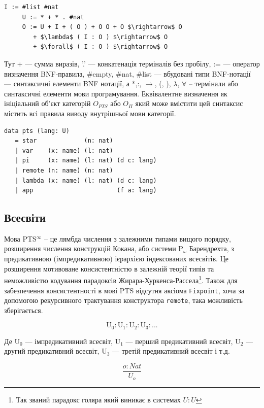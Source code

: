 \begin{lstlisting}[mathescape=true]
     I := #list #nat
     U := * + * . #nat
     O := U + I + ( O ) + O O + O $\rightarrow$ O
        + $\lambda$ ( I : O ) $\rightarrow$ O
        + $\forall$ ( I : O ) $\rightarrow$ O
\end{lstlisting}

Тут + --- сумма виразів, '.' --- конкатенація терміналів без пробілу,
:= --- оператор визначення BNF-правила, \#empty, \#nat, \#list --- вбудовані типи BNF-нотації
--- синтаксичні елементи BNF нотації,
а *,:, $\rightarrow$, (, ), $\lambda$, $\forall$ -- термінали або синтаксичні елементи мови програмування.
Еквівалентне визначення як ініціальний об'єкт категорій $O_{PTS}$ або $O_\Pi$
який може вмістити цей синтаксис містить всі правила виводу
внутрішньої мови категорії.

\begin{lstlisting}[mathescape=true]
data pts (lang: U)
   = star             (n: nat)
   | var    (x: name) (l: nat)
   | pi     (x: name) (l: nat) (d c: lang)
   | remote (n: name) (n: nat)
   | lambda (x: name) (l: nat) (d c: lang)
   | app                       (f a: lang)
\end{lstlisting}

\subsection{Всесвіти}
Мова PTS$^\infty$ -- це лямбда числення з залежними типами вищого порядку,
розширення числення конструкцій Кокана, або системи P$_\omega$ Барендрехта,
з предикативною (імпредикативною) ієрархією індексованих всесвітів.
Це розширення мотивоване консистентністю\cite{Lof75} в залежній теорії типів та
неможливістю кодування парадоксів Жирара-Хуркенса-Рассела\footnote{Так званий парадокс голяра який виникає в системах $U : U$}. Також для
забезпечення консистентності в мові PTS відсутня аксіома \lstinline{Fixpoint}, хоча
за допомогою рекурсивного трактування конструктора \lstinline{remote},
така можливість зберігається.

$$
    \mathrm{U_0} : \mathrm{U}_1 : \mathrm{U}_2 : \mathrm{U}_3 : ...
$$

Де $\mathrm{U_0}$ --- імпредикативний всесвіт,
   $\mathrm{U_1}$ --- перший предикативний всесвіт,
   $\mathrm{U_2}$ --- другий предикативний всесвіт,
   $\mathrm{U_3}$ --- третій предикативний всесвіт і т.д.

\begin{equation}
\tag{S}
\dfrac
{o : Nat}
{U_o}
\end{equation}

